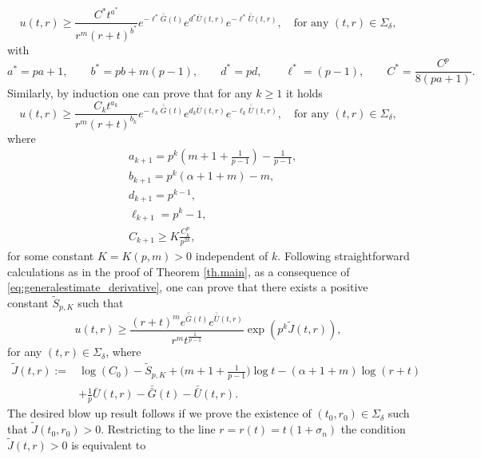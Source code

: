 \documentclass[11pt,reqno]{amsart}
\theoremstyle{definition}
\numberwithin{equation}{section}
\newenvironment{proofof}[1]{\smallskip\noindent{\textbf{Proof~of~#1.}}%
  \hspace{1pt}}{\hspace{-5pt}{\nobreak\quad\nobreak\hfill\nobreak%
    $\square$\vspace{2pt}\par}\smallskip\goodbreak}
\newcommand{\bbar}[1]{\bar{\bar{#1}}}
\begin{document}
\begin{proofof}{Theorem \ref{th.main.derivative}}
\begin{equation}
u(t,r)\geq \frac{C^*t^{a^*}}{r^m(r+t)^{b^*}}e^{-\ell^*\bbar{G}(t)} e^{d^*\bar{U}(t,r)} e^{-\ell^* \bbar{U}(t,r)}, \quad \text{for any }(t,r)\in\Sigma_\delta,
\end{equation}
with 
\begin{equation*}
a^*=pa+1, \hspace{2em} b^*=pb+m(p-1), \hspace{2em} d^*= pd, \hspace{2em} \ell^*=(p-1),  \hspace{2em} C^*=\frac{C^p}{8(pa+1)}.
\end{equation*}
%
Similarly, by induction one can prove that for any $k\geq 1$ it holds
%
\begin{equation}
\label{eq:generalestimate_derivative}
u(t,r)\geq \frac{C_kt^{a_{k}}}{r^m(r+t)^{b_k}}e^{-\ell_k \bbar G(t)}e^{d_k\bar{U}(t,r)}e^{-\ell_k \bbar U(t,r)}, \quad \text{for any }(t,r)\in\Sigma_\delta,
\end{equation}
%
where
%
\begin{align}
&a_{k+1}=p^k\left(m+1+\frac{1}{p-1}\right)-\frac{1}{p-1},\\
&b_{k+1}=p^k(\alpha+1+m)-m, \\
%
& d_{k+1}=p^{k-1}, \\
%
& \ell_{k+1}= p^k-1, \\
& C_{k+1}\geq K\frac{C_k^p}{p^{2k}},
\end{align}
for some constant $K=K(p,m)>0$ independent of $k$.
%
Following straightforward calculations as in the proof of Theorem \ref{th.main}, as a consequence of  \eqref{eq:generalestimate_derivative}, one can prove that there exists a positive constant $\tilde S_{p,K}$ such that
\begin{equation}
\label{eq:finaluestimate_derivative}
u(t,r)\geq \frac{(r+t)^m e^{\bbar G(t)} e^{\bbar U(t,r)}}{r^m t^{\frac{1}{p-1}}}\exp(p^k \tilde J(t,r)),
\end{equation}
for any $(t,r)\in \Sigma_\delta$, where 
\begin{align*}
\tilde J(t,r):=&\log(C_0)-\tilde S_{p,K}+\Big(m+1+\frac{1}{p-1}\Big)\log t-(\alpha+1+m)\log(r+t)\\
&
+\frac{1}{p}\bar U(t,r)-\bbar G(t)-\bbar U(t,r).
\end{align*}
%
The desired blow up result follows if we prove the existence of $(t_0,r_0)\in \Sigma_\delta $ such that $\tilde J(t_0,r_0)>0$.
%
Restricting to the line $r=r(t)=t\left(1+\sigma_n\right)$ the condition $\tilde J(t,r)>0$ is equivalent to 
\begin{equation}

\end{equation}
\end{proofof}
\end{document}
